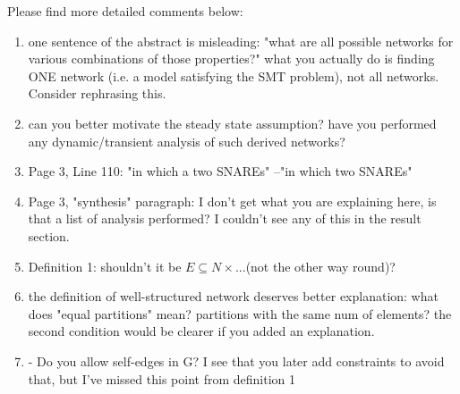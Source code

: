 \documentclass{llncs}
\begin{document}
Please find more detailed comments below:\\
\begin{enumerate}
\item one sentence of the abstract is misleading: "what are all possible networks for
various combinations of those properties?" what you actually do is finding ONE
network (i.e. a model satisfying the SMT problem), not all networks. Consider
rephrasing this.\newline
{}
{\color{red}{Mukund, Ashutosh}}\\
\item can you better motivate the steady state assumption? have you performed any
dynamic/transient analysis of such derived networks? \newline
{\color{red}{Mukund}}\\
\item Page 3, Line 110: "in which a two SNAREs" --"in which two SNAREs" \newline{\color{red}{Fixed!}}\\

\item  Page 3, "synthesis" paragraph:  I don't get what you are explaining here, is that a list of analysis performed? I couldn't see any of this in the result section. \newline
{\color{red}{Mukund}}\\

\item Definition 1: shouldn't it be $E \subseteq N \times ... $(not the other way round)? \newline
{\color{red}{Ashutosh}}\\

\item the definition of well-structured network deserves better explanation: what does
"equal partitions" mean? partitions with the same num of elements? the second
condition would be clearer if you added an explanation.\newline
{\color{red}{Ashutosh}}\\

\item -  Do you allow self-edges in G? I see that you later add constraints to avoid that, but I've missed this point from definition 1\newline
{\color{red}{Ankit, Ashutosh}}\\


\end{enumerate}
\end{document}
